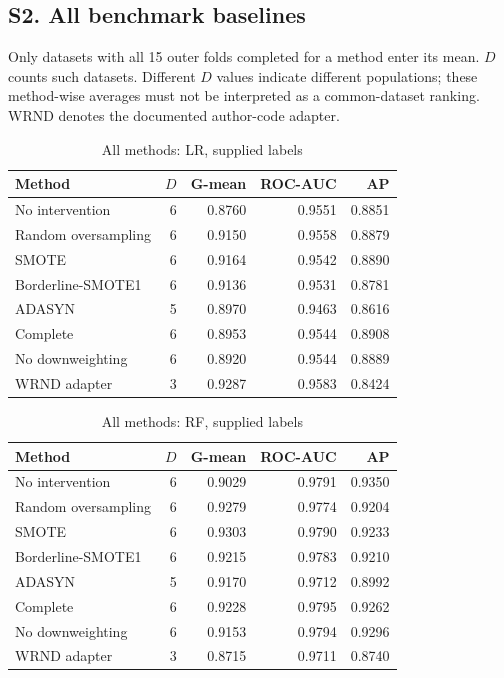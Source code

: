\subsection*{S2. All benchmark baselines}
Only datasets with all 15 outer folds completed for a method enter its mean. $D$ counts such datasets. Different $D$ values indicate different populations; these method-wise averages must not be interpreted as a common-dataset ranking. WRND denotes the documented author-code adapter.
\begin{table}[htbp]
\caption{All methods: LR, supplied labels}
\centering\small
\begin{tabular}{lrrrr}
\hline
Method & $D$ & G-mean & ROC-AUC & AP\\
\hline
No intervention & 6 & 0.8760 & 0.9551 & 0.8851 \\
Random oversampling & 6 & 0.9150 & 0.9558 & 0.8879 \\
SMOTE & 6 & 0.9164 & 0.9542 & 0.8890 \\
Borderline-SMOTE1 & 6 & 0.9136 & 0.9531 & 0.8781 \\
ADASYN & 5 & 0.8970 & 0.9463 & 0.8616 \\
Complete & 6 & 0.8953 & 0.9544 & 0.8908 \\
No downweighting & 6 & 0.8920 & 0.9544 & 0.8889 \\
WRND adapter & 3 & 0.9287 & 0.9583 & 0.8424 \\
\hline
\end{tabular}
\end{table}
\begin{table}[htbp]
\caption{All methods: RF, supplied labels}
\centering\small
\begin{tabular}{lrrrr}
\hline
Method & $D$ & G-mean & ROC-AUC & AP\\
\hline
No intervention & 6 & 0.9029 & 0.9791 & 0.9350 \\
Random oversampling & 6 & 0.9279 & 0.9774 & 0.9204 \\
SMOTE & 6 & 0.9303 & 0.9790 & 0.9233 \\
Borderline-SMOTE1 & 6 & 0.9215 & 0.9783 & 0.9210 \\
ADASYN & 5 & 0.9170 & 0.9712 & 0.8992 \\
Complete & 6 & 0.9228 & 0.9795 & 0.9262 \\
No downweighting & 6 & 0.9153 & 0.9794 & 0.9296 \\
WRND adapter & 3 & 0.8715 & 0.9711 & 0.8740 \\
\hline
\end{tabular}
\end{table}
